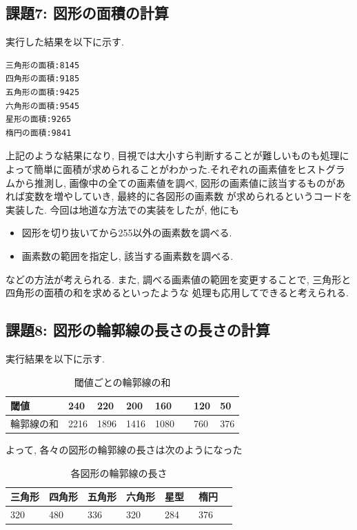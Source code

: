 \documentclass[a4paper,11pt,uplatex, titlepage]{jsarticle}
\begin{document}
\subsection{課題7: 図形の面積の計算}
実行した結果を以下に示す.
\begin{lstlisting}[basicstyle=\ttfamily\footnotesize]
三角形の面積:8145
四角形の面積:9185
五角形の面積:9425
六角形の面積:9545
星形の面積:9265
楕円の面積:9841
\end{lstlisting}
上記のような結果になり, 目視では大小すら判断することが難しいものも処理によって簡単に面積が求められることがわかった.それぞれの画素値をヒストグラムから推測し,
画像中の全ての画素値を調べ, 図形の画素値に該当するものがあれば変数を増やしていき, 最終的に各図形の画素数
が求められるというコードを実装した. 今回は地道な方法での実装をしたが, 他にも
\begin{itemize}
  \item 図形を切り抜いてから255以外の画素数を調べる.
  \item 画素数の範囲を指定し, 該当する画素数を調べる.
\end{itemize}
などの方法が考えられる. また, 調べる画素値の範囲を変更することで, 三角形と四角形の面積の和を求めるといったような
処理も応用してできると考えられる.

\subsection{課題8: 図形の輪郭線の長さの長さの計算}
実行結果を以下に示す.
\begin{table}[H]
  \begin{center}
    \caption{閾値ごとの輪郭線の和}
    \begin{tabular}{|l|l|l|l|l|l|l|}
      \hline
      閾値  & 240  & 220  & 200  & 160 & 120 & 50  \\ \hline
      輪郭線の和 & 2216 & 1896 & 1416 & 1080　& 760 & 376 \\ \hline
    \end{tabular}
  \end{center}
\end{table}

よって, 各々の図形の輪郭線の長さは次のようになった
\begin{table}[H]
  \begin{center}
    \caption{各図形の輪郭線の長さ}
    \begin{tabular}{|l|l|l|l|l|l|l|}
    \hline
    三角形 & 四角形  & 五角形 & 六角形 & 星型 & 楕円 \\ \hline
    320 & 480 & 336 & 320 & 284　& 376  \\ \hline
    \end{tabular}
  \end{center}
\end{table}
\end{document}

